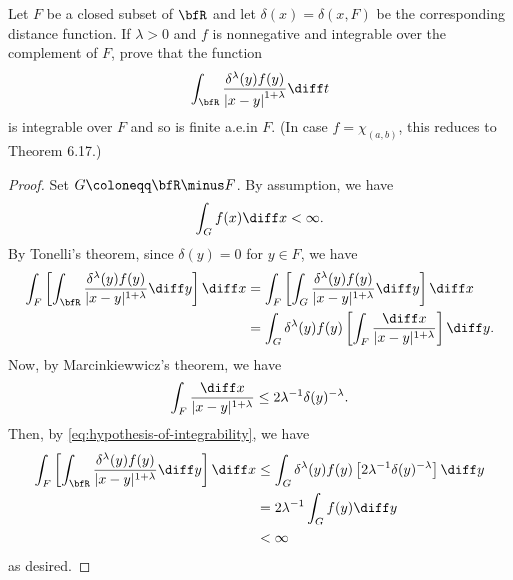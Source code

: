 \begin{problem}
Let $F$ be a closed subset of $\bfR$ and let $\delta(x)=\delta(x,F)$ be
the corresponding distance function. If $\lambda>0$ and $f$ is nonnegative
and integrable over the complement of $F$, prove that the function
\[
\int_{\bfR}\frac{\delta^\lambda(y)f(y)}{\left|x-y\right|^{1+\lambda}}\diff
t
\]
is integrable over $F$ and so is finite a.e.\@ in $F$. (In case
$f=\chi_{(a,b)}$, this reduces to Theorem 6.17.)
\end{problem}
\begin{proof}
Set $G\coloneqq\bfR\minus F$. By assumption, we have
\begin{equation}
  \label{eq:hypothesis-of-integrability}
\int_Gf(x)\diff x<\infty.
\end{equation}
By Tonelli's theorem, since $\delta(y)=0$ for $y\in F$, we have
\begin{equation}
\label{eq:application-of-tonelli}
\begin{aligned}[t]
\int_F\left[\int_\bfR\frac{\delta^\lambda(y)f(y)}{|x-y|^{1+\lambda}}\diff
  y\right]\diff x
&=\int_F\left[\int_G\frac{\delta^\lambda(y)f(y)}{|x-y|^{1+\lambda}}\diff
  y\right]\diff x\\
&=\int_G\delta^\lambda(y)f(y)\left[\int_F\frac{\diff
    x}{|x-y|^{1+\lambda}}\right]\diff y.
\end{aligned}
\end{equation}
Now, by Marcinkiewwicz's theorem, we have
\begin{equation}
  \label{eq:application-of-marcinkiewicz}
\int_F\frac{\diff x}{|x-y|^{1+\lambda}}\leq
2\lambda^{-1}\delta(y)^{-\lambda}.
\end{equation}
Then, by \eqref{eq:hypothesis-of-integrability}, we have
\begin{equation}
\label{eq:application-of-fubini-2}
\begin{aligned}[t]
 \int_F\left[\int_\bfR\frac{\delta^{\lambda}(y)f(y)}{|x-y|^{1+\lambda}}\diff
y\right]\diff x
&\leq\int_G\delta^\lambda(y)f(y)\left[2\lambda^{-1}\delta(y)^{-\lambda}\right]\diff
y\\
&=2\lambda^{-1}\int_Gf(y)\diff y\\
&<\infty
\end{aligned}
\end{equation}
as desired.
\end{proof}
\newpage

